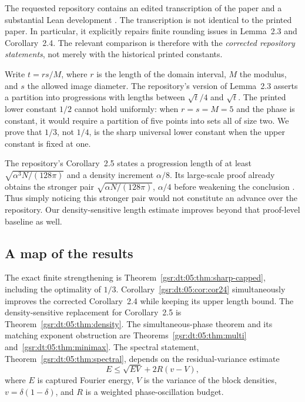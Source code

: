 \documentclass[11pt,letterpaper]{article}
\numberwithin{equation}{section}
\theoremstyle{definition}
\theoremstyle{remark}
\newcommand{\1}{\mathbf 1}
\begin{document}
The requested repository contains an edited transcription of the paper and a substantial Lean development \cite{repo05paper,repo05partition,repo05density}. The transcription is not identical to the printed paper. In particular, it explicitly repairs finite rounding issues in Lemma~2.3 and Corollary~2.4. The relevant comparison is therefore with the \emph{corrected repository statements}, not merely with the historical printed constants.

Write $t=rs/M$, where $r$ is the length of the domain interval, $M$ the modulus, and $s$ the allowed image diameter. The repository's version of Lemma~2.3 asserts a partition into progressions with lengths between $\sqrt t/4$ and $\sqrt t$. The printed lower constant $1/2$ cannot hold uniformly: when $r=s=M=5$ and the phase is constant, it would require a partition of five points into sets all of size two. We prove that $1/3$, not $1/4$, is the sharp universal lower constant when the upper constant is fixed at one.

The repository's Corollary~2.5 states a progression length of at least $\sqrt{\alpha^3N/(128\pi)}$ and a density increment $\alpha/8$. Its large-scale proof already obtains the stronger pair $\sqrt{\alpha N/(128\pi)}$, $\alpha/4$ before weakening the conclusion \cite{repo05density}. Thus simply noticing this stronger pair would not constitute an advance over the repository. Our density-sensitive length estimate improves beyond that proof-level baseline as well.

\subsection{A map of the results}
The exact finite strengthening is Theorem~\ref{gsr:dt:05:thm:sharp-capped}, including the optimality of $1/3$. Corollary~\ref{gsr:dt:05:cor:cor24} simultaneously improves the corrected Corollary~2.4 while keeping its upper length bound. The density-sensitive replacement for Corollary~2.5 is Theorem~\ref{gsr:dt:05:thm:density}. The simultaneous-phase theorem and its matching exponent obstruction are Theorems~\ref{gsr:dt:05:thm:multi} and~\ref{gsr:dt:05:thm:minimax}. The spectral statement, Theorem~\ref{gsr:dt:05:thm:spectral}, depends on the residual-variance estimate
\begin{equation}
 E\leq\sqrt{EV}+2R(v-V),
 \label{gsr:fm:05:eq:headline-residual}
\end{equation}
where $E$ is captured Fourier energy, $V$ is the variance of the block densities, $v=\delta(1-\delta)$, and $R$ is a weighted phase-oscillation budget.
\end{document}
